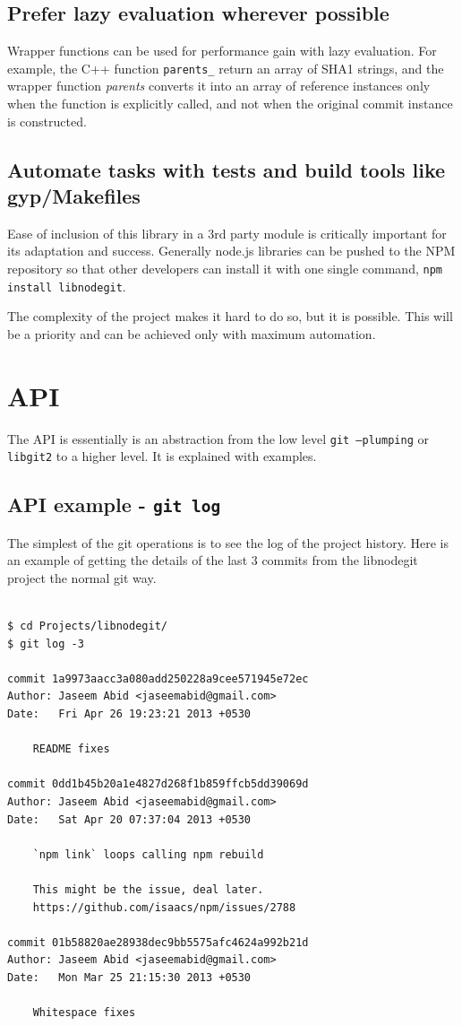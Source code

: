 \subsection{Prefer lazy evaluation wherever possible}

Wrapper functions can be used for performance gain with lazy evaluation. For
example, the C++ function \texttt{parents\_} return an array of SHA1 strings, and the
wrapper function \textit{parents} converts it into an array of reference instances only
when the function is explicitly called, and not when the original commit instance is
constructed.

\subsection{Automate tasks with tests and build tools like gyp/Makefiles}
Ease of inclusion of this library in a 3rd party module is critically important
for its adaptation and success. Generally node.js libraries can be pushed to the
NPM\cite{npm} repository so that other developers can install it with one single
command, \texttt{npm install libnodegit}.

The complexity of the project makes it hard to do so, but it is possible. This
will be a priority and can be achieved only with maximum automation.

\section{API}

The API is essentially is an abstraction from the low level \texttt{git
  --plumping} or \texttt{libgit2} to a higher level. It is explained with
examples.

\subsection{API example - \texttt{git log}}

The simplest of the git operations is to see the log of the project history.
Here is an example of getting the details of the last 3 commits from the
libnodegit project the normal git way.

\begin{verbatim}

$ cd Projects/libnodegit/
$ git log -3

commit 1a9973aacc3a080add250228a9cee571945e72ec
Author: Jaseem Abid <jaseemabid@gmail.com>
Date:   Fri Apr 26 19:23:21 2013 +0530

    README fixes

commit 0dd1b45b20a1e4827d268f1b859ffcb5dd39069d
Author: Jaseem Abid <jaseemabid@gmail.com>
Date:   Sat Apr 20 07:37:04 2013 +0530

    `npm link` loops calling npm rebuild

    This might be the issue, deal later.
    https://github.com/isaacs/npm/issues/2788

commit 01b58820ae28938dec9bb5575afc4624a992b21d
Author: Jaseem Abid <jaseemabid@gmail.com>
Date:   Mon Mar 25 21:15:30 2013 +0530

    Whitespace fixes

\end{verbatim}

